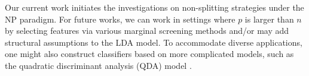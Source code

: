 \documentclass[12pt]{article}
\numberwithin{equation}{section}
\theoremstyle{remark}
\newcommand{\1}{{\rm 1}\kern-0.24em{\rm I}}
\begin{document}
Our current work initiates  %
the investigations on non-splitting strategies under the NP paradigm.  For future works, we can work in settings where $p$ is larger than $n$ by selecting features via various marginal screening methods \citep{fan2010sure, li2012feature} and/or may add structural assumptions to the LDA model.  To accommodate diverse applications, one might also construct classifiers based on more complicated models, such as the quadratic discriminant analysis (QDA) model \citep{fan2015innovated, li2015sparse, yang2018quadratic,  pan2020efficient, wang2021phase, cai2021convex}.  


\end{document}
